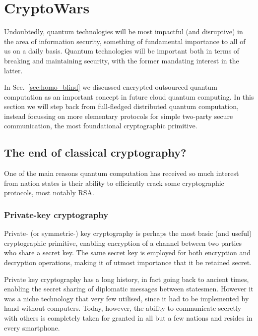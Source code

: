 %
%

\section{CryptoWars\texttrademark}



Undoubtedly, quantum technologies will be most impactful (and disruptive) in the area of information security, something of fundamental importance to all of us on a daily basis. Quantum technologies will be important both in terms of breaking and maintaining security, with the former mandating interest in the latter.

In Sec.~\ref{sec:homo_blind} we discussed encrypted outsourced quantum computation as an important concept in future cloud quantum computing. In this section we will step back from full-fledged distributed quantum computation, instead focussing on more elementary protocols for simple two-party secure communication, the most foundational cryptographic primitive.

\subsection{The end of classical cryptography?}

One of the main reasons quantum computation has received so much interest from nation states is their ability to efficiently crack some cryptographic protocols, most notably RSA.

\subsubsection{Private-key cryptography}

Private- (or symmetric-) key cryptography is perhaps the most basic (and useful) cryptographic primitive, enabling encryption of a channel between two parties who share a secret key. The same secret key is employed for both encryption and decryption operations, making it of utmost importance that it be retained secret.

Private key cryptography has a long history, in fact going back to ancient times, enabling the secret sharing of diplomatic messages between statesmen. However it was a niche technology that very few utilised, since it had to be implemented by hand without computers. Today, however, the ability to communicate secretly with others is completely taken for granted in all but a few nations and resides in every smartphone.


